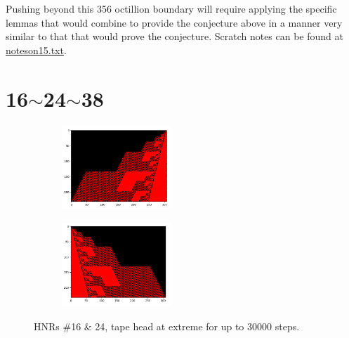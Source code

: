 \documentclass[12pt]{article}
\begin{document}
Pushing beyond this 356 octillion boundary will require applying the specific lemmas that would
combine to provide the conjecture above in a manner very similar to that that would prove the conjecture.
Scratch notes can be found at
\href{https://github.com/danbriggs/Turing/blob/master/paper/noteson15.txt}{noteson15.txt}.

\clearpage
{}
{}
\section*{16$\sim$24$\sim$38}

\begin{figure}[H]
\centering
\begin{subfigure}
\centering
\includegraphics[width=0.45\textwidth]{16.png}
\label{fig:16}
\end{subfigure}
\hfill
\begin{subfigure}
\centering
\includegraphics[width=0.45\textwidth]{24.png}
\label{fig:24}
\end{subfigure}
\caption{HNRs \#16 \& 24, tape head at extreme for up to 30000 steps.}
\end{figure}
\end{document}
